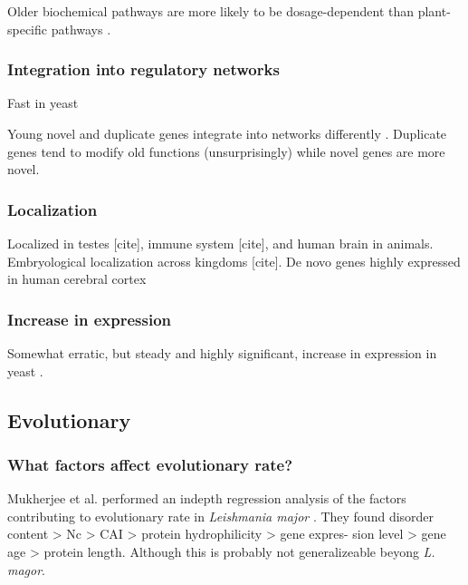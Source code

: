   Older biochemical pathways are more likely to be dosage-dependent than
  plant-specific pathways \cite{shi_genome-wide_2015}.

  \subsubsection{Integration into regulatory networks}

  Fast in yeast \cite{abrusan_integration_2013}

  \FloatBarrier

  Young novel and duplicate genes integrate into networks differently
  \cite{capra_novel_2010}. Duplicate genes tend to modify old functions
  (unsurprisingly) while novel genes are more novel.

  \subsubsection{Localization}
        
  Localized in testes [cite], immune system [cite], and human
  brain \cite{li_human-specific_2010} in animals.
  Embryological localization across kingdoms [cite].  De novo
  genes highly expressed in human cerebral cortex
  \cite{wu_novo_2011}

  \subsubsection{Increase in expression}

  
  Somewhat erratic, but steady and highly significant, increase in
  expression in yeast \cite{carvunis_proto-genes_2012}.

\subsection{Evolutionary}

  \subsubsection{What factors affect evolutionary rate?}

  Mukherjee et al. performed an indepth regression analysis of the factors
  contributing to evolutionary rate in \textit{Leishmania major}
  \cite{mukherjee_elucidating_2015}. They found disorder content > Nc > CAI >
  protein hydrophilicity > gene expres- sion level > gene age > protein
  length. Although this is probably not generalizeable beyong \textit{L.
  magor}.
  


